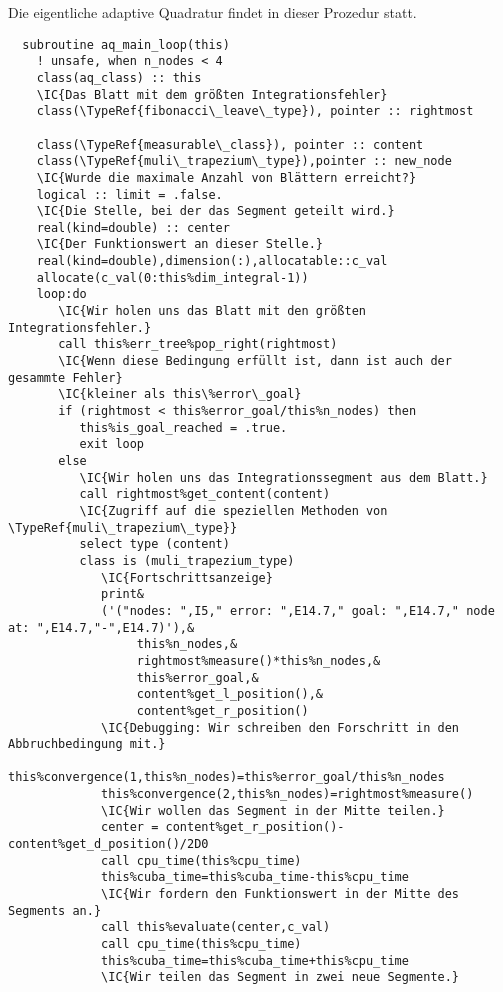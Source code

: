 Die eigentliche adaptive Quadratur findet in dieser Prozedur statt.
\begin{Verbatim}
  subroutine aq_main_loop(this)
    ! unsafe, when n_nodes < 4
    class(aq_class) :: this
    \IC{Das Blatt mit dem größten Integrationsfehler}
    class(\TypeRef{fibonacci\_leave\_type}), pointer :: rightmost
    
    class(\TypeRef{measurable\_class}), pointer :: content
    class(\TypeRef{muli\_trapezium\_type}),pointer :: new_node
    \IC{Wurde die maximale Anzahl von Blättern erreicht?}
    logical :: limit = .false.
    \IC{Die Stelle, bei der das Segment geteilt wird.}
    real(kind=double) :: center
    \IC{Der Funktionswert an dieser Stelle.}
    real(kind=double),dimension(:),allocatable::c_val
    allocate(c_val(0:this%dim_integral-1))
    loop:do
       \IC{Wir holen uns das Blatt mit den größten Integrationsfehler.}
       call this%err_tree%pop_right(rightmost)
       \IC{Wenn diese Bedingung erfüllt ist, dann ist auch der gesammte Fehler}
       \IC{kleiner als this\%error\_goal}
       if (rightmost < this%error_goal/this%n_nodes) then
          this%is_goal_reached = .true.
          exit loop
       else
          \IC{Wir holen uns das Integrationssegment aus dem Blatt.}
          call rightmost%get_content(content)
          \IC{Zugriff auf die speziellen Methoden von \TypeRef{muli\_trapezium\_type}}
          select type (content)
          class is (muli_trapezium_type)
             \IC{Fortschrittsanzeige}
             print&
             ('("nodes: ",I5," error: ",E14.7," goal: ",E14.7," node at: ",E14.7,"-",E14.7)'),&
                  this%n_nodes,&
                  rightmost%measure()*this%n_nodes,&
                  this%error_goal,&
                  content%get_l_position(),&
                  content%get_r_position()
             \IC{Debugging: Wir schreiben den Forschritt in den Abbruchbedingung mit.}
             this%convergence(1,this%n_nodes)=this%error_goal/this%n_nodes
             this%convergence(2,this%n_nodes)=rightmost%measure()
             \IC{Wir wollen das Segment in der Mitte teilen.}
             center = content%get_r_position()-content%get_d_position()/2D0
             call cpu_time(this%cpu_time)
             this%cuba_time=this%cuba_time-this%cpu_time
             \IC{Wir fordern den Funktionswert in der Mitte des Segments an.}
             call this%evaluate(center,c_val)
             call cpu_time(this%cpu_time)
             this%cuba_time=this%cuba_time+this%cpu_time
             \IC{Wir teilen das Segment in zwei neue Segmente.}

\end{Verbatim}
